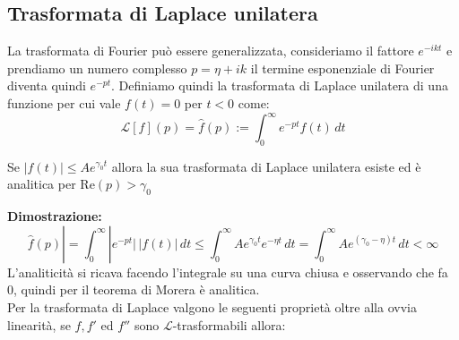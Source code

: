 \subsection{Trasformata di Laplace unilatera}
La trasformata di Fourier può essere generalizzata, consideriamo il fattore $e^{-ikt}$ e prendiamo un numero complesso $p = \eta +ik$ il termine esponenziale di Fourier diventa quindi $e^{-pt}$. Definiamo quindi la trasformata di Laplace unilatera di una funzione per cui vale $f(t) = 0 $ per $t<0$ come:
\[\mathcal{L}[f](p) = \hat{f}(p) := \int_0^\infty e^{-pt} f(t)\,dt \]
\begin{thm}
Se $|f(t)|\leq A e^{\gamma_0t}$ allora la sua trasformata di Laplace unilatera esiste ed è analitica per $\text{Re}(p)>\gamma_0$
\end{thm} 
\hspace{-1.6em}\textbf{Dimostrazione:}\\
\[\hat{f}(p)| = \int_0^\infty |e^{-pt}|\, |f(t)|\,dt\leq \int_0^\infty Ae^{\gamma_0t} e^{-\eta t}\,dt = \int_0^\infty Ae^{(\gamma_0-\eta)t}\,dt< \infty \]
L'analiticità si ricava facendo l'integrale su una curva chiusa e osservando che fa 0, quindi per il teorema di Morera è analitica.\\
\newline Per la trasformata di Laplace valgono le seguenti proprietà oltre alla ovvia linearità, se $f,f'$ ed $f''$ sono $\mathcal{L}$-trasformabili allora:


